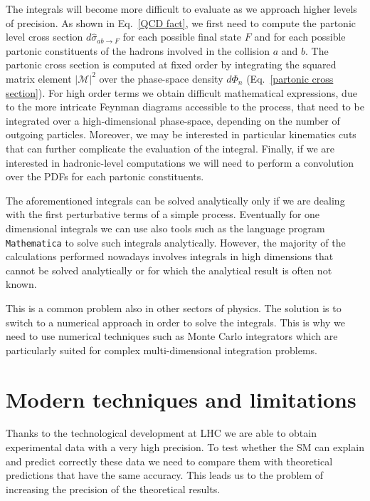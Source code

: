 \documentclass[../main/main.tex]{subfiles}
\begin{document}
The integrals will become more difficult to evaluate as we approach higher levels of precision. As shown in Eq.~\ref{QCD fact}, we first need to compute the partonic level cross section  $d\hat{\sigma}_{ab \rightarrow F}$ for each possible final state $F$ and for each possible partonic constituents of the hadrons involved in the collision $a$ and $b$. The partonic cross section is computed at fixed order by integrating the squared matrix element $|\mathcal{M}|^2$ over the phase-space density $d\Phi_n$ (Eq.~\ref{partonic cross section}). For high order terms we obtain difficult mathematical expressions, due to the more intricate Feynman diagrams accessible to the process, that need to be integrated over a high-dimensional phase-space, depending on the number of outgoing particles. Moreover, we may be interested in particular kinematics cuts that can further complicate the evaluation of the integral. Finally, if we are interested in hadronic-level computations we will need to perform a convolution over the PDFs for each partonic constituents.

The aforementioned integrals can be solved analytically only if we are dealing with the first perturbative terms of a simple process. Eventually for one dimensional integrals we can use also tools such as the language program \texttt{Mathematica} \cite{Mathematica} to solve such integrals analytically. However, the majority of the calculations performed nowadays involves integrals in high dimensions that cannot be solved analytically or for which the analytical result is often not known.

This is a common problem also in other sectors of physics. The solution is to switch to a numerical approach in order to solve the integrals. This is why we need to use numerical techniques such as Monte Carlo integrators which are particularly suited for complex multi-dimensional integration problems.  



\section{Modern techniques and limitations}

Thanks to the technological development at LHC we are able to obtain experimental data with a very high precision. To test whether 
the SM can explain and predict correctly these data we need to compare them with  theoretical predictions that have the same accuracy. This leads us to the problem of increasing the precision of the theoretical results. 
\end{document}
